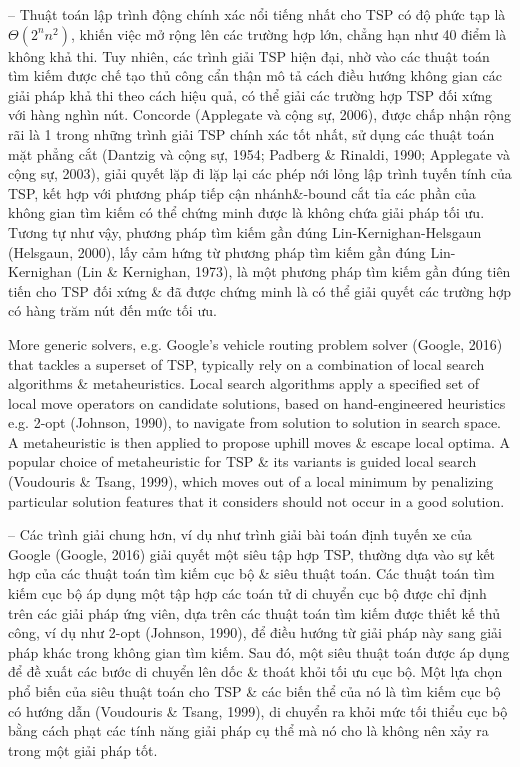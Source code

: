 \documentclass{article}
\begin{document}
\begin{itemize}
    -- Thuật toán lập trình động chính xác nổi tiếng nhất cho TSP có độ phức tạp là $\Theta(2^nn^2)$, khiến việc mở rộng lên các trường hợp lớn, chẳng hạn như 40 điểm là không khả thi. Tuy nhiên, các trình giải TSP hiện đại, nhờ vào các thuật toán tìm kiếm được chế tạo thủ công cẩn thận mô tả cách điều hướng không gian các giải pháp khả thi theo cách hiệu quả, có thể giải các trường hợp TSP đối xứng với hàng nghìn nút. Concorde (Applegate và cộng sự, 2006), được chấp nhận rộng rãi là 1 trong những trình giải TSP chính xác tốt nhất, sử dụng các thuật toán mặt phẳng cắt (Dantzig và cộng sự, 1954; Padberg \& Rinaldi, 1990; Applegate và cộng sự, 2003), giải quyết lặp đi lặp lại các phép nới lỏng lập trình tuyến tính của TSP, kết hợp với phương pháp tiếp cận nhánh\&-bound cắt tỉa các phần của không gian tìm kiếm có thể chứng minh được là không chứa giải pháp tối ưu. Tương tự như vậy, phương pháp tìm kiếm gần đúng Lin-Kernighan-Helsgaun (Helsgaun, 2000), lấy cảm hứng từ phương pháp tìm kiếm gần đúng Lin-Kernighan (Lin \& Kernighan, 1973), là một phương pháp tìm kiếm gần đúng tiên tiến cho TSP đối xứng \& đã được chứng minh là có thể giải quyết các trường hợp có hàng trăm nút đến mức tối ưu.
    
    More generic solvers, e.g. Google's vehicle routing problem solver (Google, 2016) that tackles a superset of TSP, typically rely on a combination of local search algorithms \& metaheuristics. Local search algorithms apply a specified set of local move operators on candidate solutions, based on hand-engineered heuristics e.g. 2-opt (Johnson, 1990), to navigate from solution to solution in search space. A metaheuristic is then applied to propose uphill moves \& escape local optima. A popular choice of metaheuristic for TSP \& its variants is guided local search (Voudouris \& Tsang, 1999), which moves out of a local minimum by penalizing particular solution features that it considers should not occur in a good solution.
    
    -- Các trình giải chung hơn, ví dụ như trình giải bài toán định tuyến xe của Google (Google, 2016) giải quyết một siêu tập hợp TSP, thường dựa vào sự kết hợp của các thuật toán tìm kiếm cục bộ \& siêu thuật toán. Các thuật toán tìm kiếm cục bộ áp dụng một tập hợp các toán tử di chuyển cục bộ được chỉ định trên các giải pháp ứng viên, dựa trên các thuật toán tìm kiếm được thiết kế thủ công, ví dụ như 2-opt (Johnson, 1990), để điều hướng từ giải pháp này sang giải pháp khác trong không gian tìm kiếm. Sau đó, một siêu thuật toán được áp dụng để đề xuất các bước di chuyển lên dốc \& thoát khỏi tối ưu cục bộ. Một lựa chọn phổ biến của siêu thuật toán cho TSP \& các biến thể của nó là tìm kiếm cục bộ có hướng dẫn (Voudouris \& Tsang, 1999), di chuyển ra khỏi mức tối thiểu cục bộ bằng cách phạt các tính năng giải pháp cụ thể mà nó cho là không nên xảy ra trong một giải pháp tốt.
    

\end{itemize}
\end{document}
